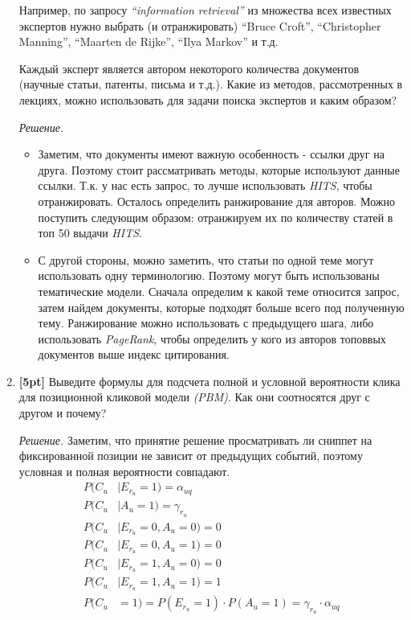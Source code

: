 \begin{enumerate}
	Например, по запросу \textit{``information retrieval''} из множества всех известных 
	экспертов	нужно выбрать (и отранжировать) ``Bruce Croft'', ``Christopher Manning'', 
	``Maarten de Rijke'', ``Ilya Markov'' и т.д.
	
	Каждый эксперт является автором некоторого количества документов (научные статьи, патенты, 
	письма и т.д.). Какие из методов, рассмотренных в лекциях, можно использовать для задачи 
	поиска экспертов и каким образом?
	
	\textit{Решение.} 
	
	
	\begin{itemize}
		\item Заметим, что документы имеют важную особенность - ссылки друг на друга. Поэтому стоит 
		рассматривать методы, которые используют данные ссылки. Т.к. у нас есть запрос, то лучше 
		использовать \textit{HITS}, чтобы отранжировать. Осталось определить ранжирование для 
		авторов. Можно поступить следующим образом: отранжируем их по количеству статей в топ 50 
		выдачи \textit{HITS}.
		\item С другой стороны, можно заметить, что статьи по одной теме могут использовать одну 
		терминологию. Поэтому могут быть использованы тематические модели. Сначала определим к 
		какой теме относится запрос, затем найдем документы, которые подходят больше всего под 
		полученную тему. Ранжирование можно использовать с предыдущего шага, либо использовать 
		\textit{PageRank}, чтобы определить у кого из авторов топоввых документов выше индекс цитирования.
	\end{itemize}
	
	\item \textbf{[5pt]} Выведите формулы для подсчета полной и условной вероятности клика для	
	позиционной кликовой модели \textit{(PBM)}. Как они соотносятся друг с другом и почему?
	
	\textit{Решение.} Заметим, что принятие решение просматривать ли сниппет на фиксированной позиции не зависит от предыдущих событий, поэтому условная и полная вероятности совпадают.
	\begin{align*}
		P(C_u &|E_{r_u} = 1 ) = \alpha_{uq}\\
		P(C_u &|A_u = 1) = \gamma_{r_u}\\
		P(C_u &|E_{r_u} = 0 , A_u = 0) = 0\\
		P(C_u &|E_{r_u} = 0 , A_u = 1) = 0\\
		P(C_u &|E_{r_u} = 1 , A_u = 0) = 0\\
		P(C_u &|E_{r_u} = 1 , A_u = 1) = 1 \\
		P(C_u &= 1) = P(E_{r_u} = 1) \cdot P(A_u = 1) = \gamma_{r_u} \cdot \alpha_{uq}
	\end{align*}
	

\end{enumerate}
